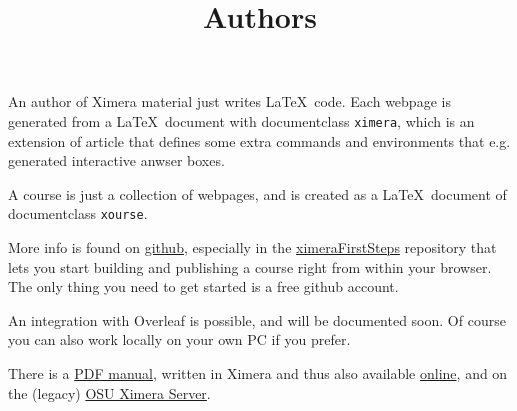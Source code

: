 \documentclass{ximera}
\title{Authors}
\begin{document}
\begin{abstract}
\end{abstract}
\maketitle

An author of Ximera material just writes \LaTeX\ code. 
Each webpage is generated from a \LaTeX\ document with documentclass \verb|ximera|, which is an extension of article that defines some extra commands and environments that e.g. generated interactive anwser boxes.

A course is just a collection of webpages, and is created as a \LaTeX\ document of documentclass \verb|xourse|.

More info is found on \href{https://github.com/XimeraProject}{github}, 
especially in the \href{https://github.com/XimeraProject/ximeraFirstSteps}{ximeraFirstSteps} repository that lets you start building and publishing a course right from within your browser.
The only thing you need to get started is a free github account.

An integration with Overleaf is possible, and will be documented soon.
Of course you can also work locally on your own PC if you prefer.

There is a \href{https://github.com/XimeraProject/ximeraManuals/releases/download/v1.5.0/ximeraUserManual.pdf}{PDF manual}, 
written in Ximera and thus also available 
\href{https://set-p-dsb-zomercursus-latest.cloud-ext.icts.kuleuven.be/xmanual/ximeraUserManual/introductionAndSetup/aboutXimera}{online}, and 
on the (legacy) \href{https://ximera.osu.edu/xmanual/ximeraUserManual/introductionAndSetup/aboutXimera}{OSU Ximera Server}.
\end{document}
